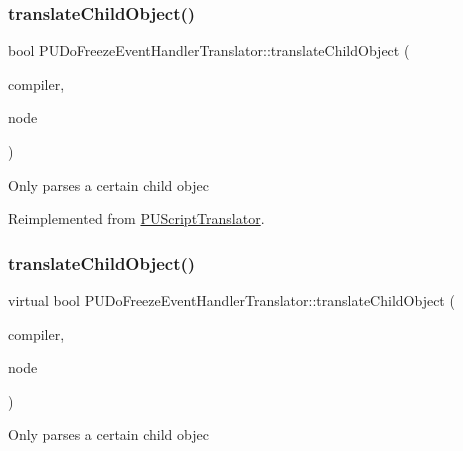 \subsubsection{\texorpdfstring{translate\+Child\+Object()}{translateChildObject()}\hspace{0.1cm}{\footnotesize\ttfamily [1/2]}}
{\footnotesize\ttfamily bool P\+U\+Do\+Freeze\+Event\+Handler\+Translator\+::translate\+Child\+Object (\begin{DoxyParamCaption}\item[{\hyperlink{classPUScriptCompiler}{P\+U\+Script\+Compiler} $\ast$}]{compiler,  }\item[{\hyperlink{classPUAbstractNode}{P\+U\+Abstract\+Node} $\ast$}]{node }\end{DoxyParamCaption})\hspace{0.3cm}{\ttfamily [virtual]}}

Only parses a certain child objec 

Reimplemented from \hyperlink{classPUScriptTranslator_ab587d01348ae3e678cb700c719b2b113}{P\+U\+Script\+Translator}.

\mbox{\label{classPUDoFreezeEventHandlerTranslator_a1b6b4fcb7fd47cba34cc3c9ca72b9964}} 
\subsubsection{\texorpdfstring{translate\+Child\+Object()}{translateChildObject()}\hspace{0.1cm}{\footnotesize\ttfamily [2/2]}}
{\footnotesize\ttfamily virtual bool P\+U\+Do\+Freeze\+Event\+Handler\+Translator\+::translate\+Child\+Object (\begin{DoxyParamCaption}\item[{\hyperlink{classPUScriptCompiler}{P\+U\+Script\+Compiler} $\ast$}]{compiler,  }\item[{\hyperlink{classPUAbstractNode}{P\+U\+Abstract\+Node} $\ast$}]{node }\end{DoxyParamCaption})\hspace{0.3cm}{\ttfamily [virtual]}}

Only parses a certain child objec 

